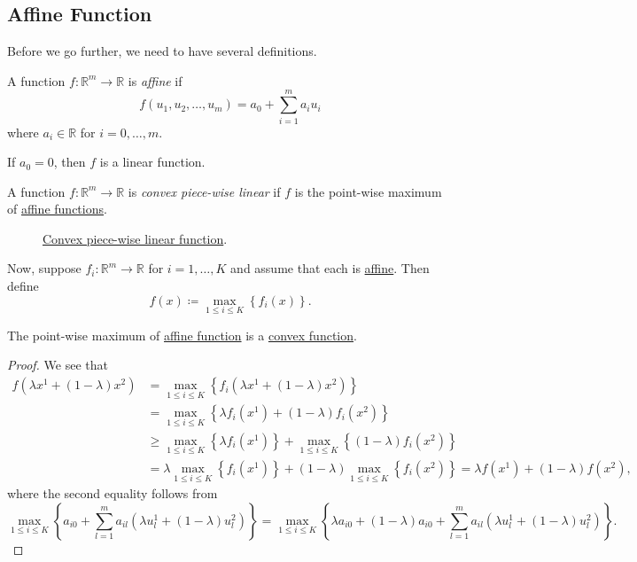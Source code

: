 \subsection{Affine Function}
Before we go further, we need to have several definitions.
\begin{definition}\label{def:affine-function}
	A function \(f\colon \mathbb{R}^{m}\to \mathbb{R}\) is \emph{affine} if
	\[
		f(u_1, u_2, \ldots , u_m) = a_0 + \sum\limits_{i=1}^{m} a_{i}u_{i}
	\]
	where \(a_i \in\mathbb{R}\) for \(i = 0, \ldots , m\).
\end{definition}

\begin{remark}
	If \(a_0 = 0\), then \(f\) is a linear function.
\end{remark}

\begin{definition}\label{def:convex-piece-wise-linear-function}
	A function \(f\colon \mathbb{R}^{m}\to \mathbb{R}\) is \emph{convex piece-wise linear} if \(f\) is the point-wise maximum of \hyperref[def:affine-function]{affine functions}.
\end{definition}

\begin{figure}[H]
	\centering
	\caption{\hyperref[def:convex-piece-wise-linear-function]{Convex piece-wise linear function}.}
	\label{fig:convex-piecewise-linear-function}
\end{figure}
Now, suppose \(f_{i}\colon \mathbb{R}^m \to \mathbb{R}\) for \(i = 1, \ldots , K\) and assume that each is \hyperref[def:affine-function]{affine}.
Then define
\[
	f(x)\coloneqq \max_{1\leq i\leq K} \left\{ f_i(x) \right\}.
\]

\begin{theorem}
	The point-wise maximum of \hyperref[def:affine-function]{affine function} is a \hyperref[def:convex-function]{convex function}.
\end{theorem}
\begin{proof}
	We see that
	\[
		\begin{split}
			f(\lambda x^1 + (1 - \lambda)x^2) &=\max_{1\leq i\leq K}\left\{ f_i(\lambda x^1 + (1 - \lambda)x^2) \right\}\\
			&=\max_{1\leq i\leq K}\left\{ \lambda f_{i}(x^1) + (1 - \lambda)f_{i}(x^2) \right\}\\
			&\geq \max_{1\leq i\leq K}\left\{ \lambda f_{i}(x^1)\right\} + \max_{1\leq i\leq K}\left\{(1 - \lambda)f_{i}(x^2) \right\}\\
			&=\lambda\max_{1\leq i\leq K}\left\{f_{i}(x^1)\right\} + (1 - \lambda)\max_{1\leq i\leq K}\left\{f_{i}(x^2) \right\}
			= \lambda f(x^1)+(1 - \lambda)f(x^2),
		\end{split}
	\]
	where the second equality follows from
	\[
		\max_{1\leq i\leq K}\left\{ a_{i0}+\sum\limits_{l=1}^{m} a_{il}(\lambda u^1_l + (1 - \lambda)u^2_l) \right\}
		= \max_{1\leq i\leq K}\left\{ \lambda a_{i0}+(1 - \lambda)a_{i0} + \sum\limits_{l=1}^{m} a_{il}(\lambda u^1_l + (1 - \lambda)u^2_l) \right\}.
	\]
\end{proof}